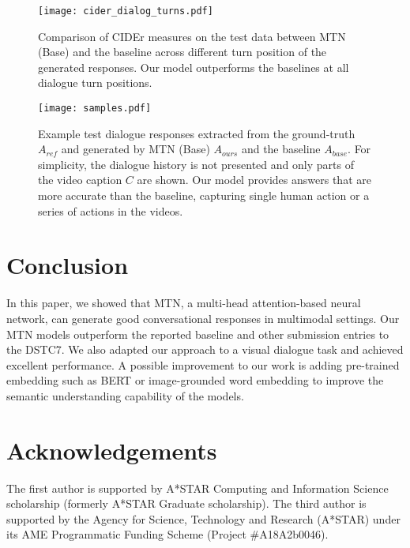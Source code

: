 \documentclass[11pt,a4paper]{article}
\begin{document}
\begin{figure}[htbp]
	\centering
	\texttt{[image: cider\_dialog\_turns.pdf]}
	\caption{Comparison of CIDEr measures on the test data between MTN (Base) and the baseline \cite{hori2018end} across different turn position of the generated responses. Our model outperforms the baselines at all dialogue turn positions.}
	\label{fig:cider_turns}
\end{figure}

\begin{figure*}[htbp]
	\centering
	\resizebox{1.0\textwidth}{!} {
	\texttt{[image: samples.pdf]}
	}
	\caption{Example test dialogue responses extracted from the ground-truth $A_{ref}$ and generated by MTN (Base) $A_{ours}$ and the baseline \cite{hori2018end} $A_{base}$. For simplicity, the dialogue history is not presented and only parts of the video caption $C$ are shown. Our model provides answers that are more accurate than the baseline, capturing single human action or a series of actions in the videos.}
	\label{fig:samples}
\end{figure*}

\section{Conclusion}
In this paper, we showed that MTN, a multi-head attention-based neural network, can generate good conversational responses in multimodal settings. 
Our MTN models outperform the reported baseline and other submission entries to the DSTC7. We also adapted our approach to a visual dialogue task and achieved excellent performance. 
A possible improvement to our work is adding pre-trained embedding such as BERT \cite{devlin2018bert} or image-grounded word embedding \cite{kiros2018illustrative} to improve the semantic understanding capability of the models. 

\section*{Acknowledgements}
The first author is supported by A*STAR Computing and Information Science scholarship (formerly A*STAR Graduate scholarship). The third author is supported by the Agency for Science, Technology and Research (A*STAR) under its AME Programmatic Funding Scheme (Project \#A18A2b0046).




\appendix 
\end{document}
